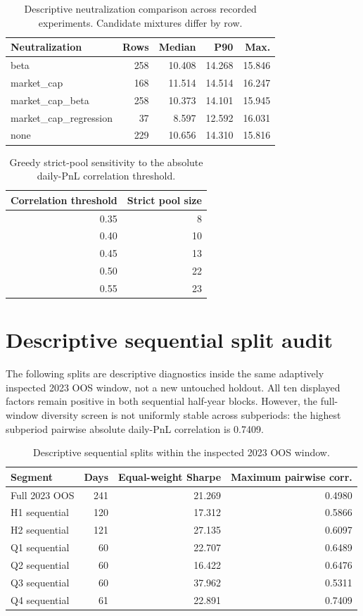 \documentclass[10pt,a4paper]{article}
\begin{document}
\begin{table}[H]\centering
\caption{Descriptive neutralization comparison across recorded experiments. Candidate mixtures differ by row.}
\begin{tabular}{l r r r r}\toprule Neutralization & Rows & Median & P90 & Max. \\\midrule
beta & 258 & 10.408 & 14.268 & 15.846 \\
market\_cap & 168 & 11.514 & 14.514 & 16.247 \\
market\_cap\_beta & 258 & 10.373 & 14.101 & 15.945 \\
market\_cap\_regression & 37 & 8.597 & 12.592 & 16.031 \\
none & 229 & 10.656 & 14.310 & 15.816 \\
\bottomrule\end{tabular}
\end{table}

\begin{table}[H]\centering
\caption{Greedy strict-pool sensitivity to the absolute daily-PnL correlation threshold.}
\begin{tabular}{r r}\toprule Correlation threshold & Strict pool size \\\midrule
0.35 & 8 \\
0.40 & 10 \\
0.45 & 13 \\
0.50 & 22 \\
0.55 & 23 \\
\bottomrule\end{tabular}
\end{table}

\section{Descriptive sequential split audit}
The following splits are descriptive diagnostics inside the same adaptively inspected 2023 OOS window, not a
new untouched holdout. All ten displayed factors remain positive in both sequential half-year blocks. However,
the full-window diversity screen is not uniformly stable across subperiods: the highest subperiod pairwise
absolute daily-PnL correlation is 0.7409.

\begin{table}[H]\centering
\caption{Descriptive sequential splits within the inspected 2023 OOS window.}
\begin{tabular}{l r r r}\toprule Segment & Days & Equal-weight Sharpe & Maximum pairwise corr. \\\midrule
Full 2023 OOS & 241 & 21.269 & 0.4980 \\
H1 sequential & 120 & 17.312 & 0.5866 \\
H2 sequential & 121 & 27.135 & 0.6097 \\
Q1 sequential & 60 & 22.707 & 0.6489 \\
Q2 sequential & 60 & 16.422 & 0.6476 \\
Q3 sequential & 60 & 37.962 & 0.5311 \\
Q4 sequential & 61 & 22.891 & 0.7409 \\
\bottomrule\end{tabular}
\end{table}
\end{document}
